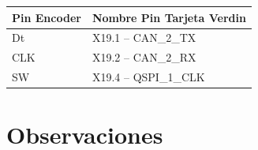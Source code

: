 \documentclass[12pt,a4paper]{article}
\begin{document}
        \begin{inlinetable}
                \caption{GPIO}
                \label{tab:uart_config}
                \begin{tabular}{ll}
                \toprule
                Pin Encoder & Nombre Pin Tarjeta Verdin \\
                \midrule
                Dt   & X19.1 – CAN\_2\_TX \\
                CLK  & X19.2 – CAN\_2\_RX     \\
                SW   & X19.4 – QSPI\_1\_CLK    \\
                \bottomrule
                \end{tabular}
            \end{inlinetable}

    

    \newpage
    \section{Observaciones}
\end{document}
